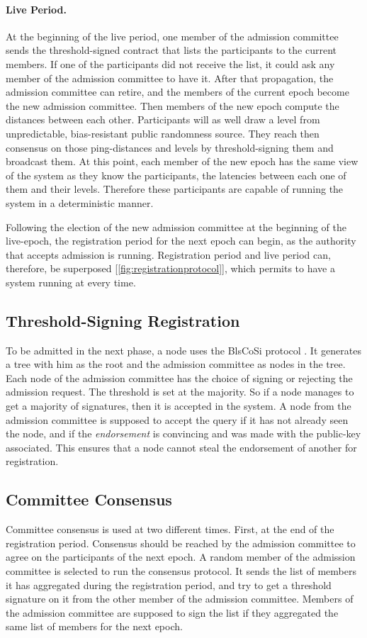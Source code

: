 \documentclass[a4paper,11pt,twoside,openright]{report}
\begin{document}
\paragraph{Live Period.}
At the beginning of the live period, one member of the admission committee sends the threshold-signed contract that lists the participants to the current
members. If one of the participants did not receive the list, it could ask any
member of the admission committee to have it. After that propagation, the
admission committee can retire, and the members of the current epoch become the
new admission committee. Then members of the new epoch compute the
distances between each other. Participants will as well draw a level from
unpredictable, bias-resistant public randomness source. They reach then
consensus on those ping-distances and levels by threshold-signing them and
broadcast them. At this point, each member of the new epoch has the same
view of the system as they know the participants, the latencies between
each one of them and their levels. Therefore these participants are capable
of running the system in a deterministic manner.

Following the election of the new admission committee at the beginning of the
live-epoch, the registration period for the next epoch can begin, as the
authority that accepts admission is running. Registration period and live
period can, therefore, be superposed [\autoref{fig:registrationprotocol}], which
permits to have a system running at every time. 

\subsection{Threshold-Signing Registration}
To be admitted in the next phase, a node uses the
BlsCoSi protocol \cite{Boneh2018}. It generates a tree with him as
the root and the admission committee as nodes in the tree. Each node of the
admission committee has the choice of signing or rejecting the admission
request. The threshold is set at the majority. So if a node manages to get a
majority of signatures, then it is accepted in the system. A node from the
admission committee is supposed to accept the query if it has not already seen
the node, and if the \textit{endorsement} is convincing and was made with the public-key
associated. This ensures that a node cannot steal the endorsement of another
for registration.  

\subsection{Committee Consensus}
Committee consensus is used at two different times. First, at the end of the
registration period. Consensus should be reached by the admission committee to agree on
the participants of the next epoch. A random member of the admission committee
is selected to run the consensus protocol. It sends the list of members
it has aggregated during the registration period, and try to get a threshold
signature on it from the other member of the admission committee. Members of
the admission committee are supposed to sign the list if they aggregated the
same list of members for the next epoch.
\end{document}
